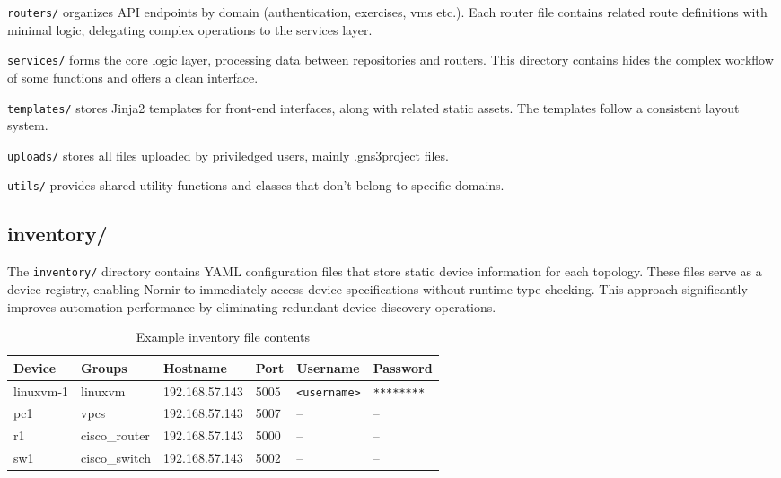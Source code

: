         \texttt{routers/} organizes API endpoints by domain (authentication, exercises, vms etc.). Each router file contains 
        related route definitions with minimal logic, delegating complex operations to the services layer.

        \texttt{services/} forms the core logic layer, processing data between repositories and routers. This directory 
        contains hides the complex workflow of some functions and offers a clean interface.

        \texttt{templates/} stores Jinja2 templates for front-end interfaces, along with related static assets. The 
        templates follow a consistent layout system.

        \texttt{uploads/} stores all files uploaded by priviledged users, mainly .gns3project files.

        \texttt{utils/} provides shared utility functions and classes that don't belong to specific domains.

    \subsection{inventory/}
        The \texttt{inventory/} directory contains YAML configuration files that store static device information 
        for each topology. These files serve as a device registry, enabling Nornir to immediately access device 
        specifications without runtime type checking. This approach significantly improves automation performance 
        by eliminating redundant device discovery operations.

        \begin{table}[h]
            \centering
            \caption{Example inventory file contents}
            \label{tab:devices}
            \begin{tabular}{>{\ttfamily}llllll}
            \toprule
            \rowcolor{lightgray}
            \textrm{\normalfont Device} & \textrm{\normalfont Groups} & \textrm{\normalfont Hostname} & \textrm{\normalfont Port} & \textrm{\normalfont Username} & \textrm{\normalfont Password} \\
            \midrule
            linuxvm-1 & linuxvm & 192.168.57.143 & 5005 & \texttt{<username>} & \texttt{********} \\
            pc1 & vpcs & 192.168.57.143 & 5007 & -- & -- \\
            r1 & cisco\_router & 192.168.57.143 & 5000 & -- & -- \\
            sw1 & cisco\_switch & 192.168.57.143 & 5002 & -- & -- \\
            \bottomrule
            \end{tabular}
        \end{table}


